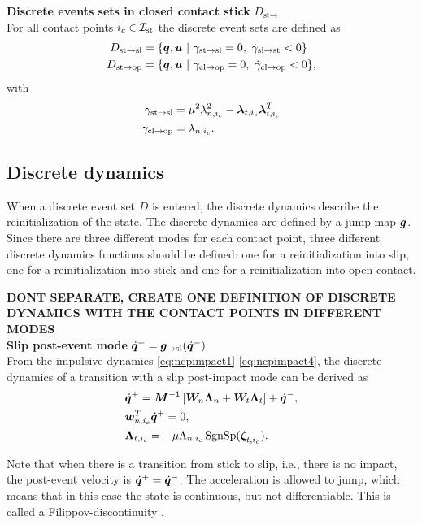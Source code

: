 \documentclass[../DC2017114Bouma.tex]{subfiles}
\begin{document}
\textbf{Discrete events sets in closed contact stick} $D_{\text{st}\rightarrow}$\\
For all contact points $i_c\in\mathcal{I}_{\text{st}}$ the discrete event sets are defined as
\begin{align}
D_{\text{st}\rightarrow\text{sl}} &= \{ \qb,\ub\ |\ \gamma_{\text{st}\rightarrow\text{sl}} = 0,\ \dot{\gamma}_{\text{sl}\rightarrow\text{st}} < 0\}\\
D_{\text{st}\rightarrow\text{op}} &= \{ \qb,\ub\ |\ \gamma_{\text{cl}\rightarrow\text{op}} = 0,\ \dot{\gamma}_{\text{cl}\rightarrow\text{op}} < 0\},
\end{align}
with 
\begin{align}
\gamma_{\text{st}\rightarrow\text{sl}} &= \mu^2\lambda_{n,i_c}^2-\boldsymbol{\lambda}_{t,i_c}\boldsymbol{\lambda}_{t,i_c}^T\\
\gamma_{\text{cl}\rightarrow\text{op}} &= \lambda_{n,i_c}.
\end{align}

\subsection{Discrete dynamics}\label{sec:2discdyn}
When a discrete event set $D$ is entered, the discrete dynamics describe the reinitialization of the state. The discrete dynamics are defined by a jump map ${\boldsymbol{g}}$. Since there are three different modes for each contact point, three different discrete dynamics functions should be defined: one for a reinitialization into slip, one for a reinitialization into stick and one for a reinitialization into open-contact.

\textbf{DONT SEPARATE, CREATE ONE DEFINITION OF DISCRETE DYNAMICS WITH THE CONTACT POINTS IN DIFFERENT MODES}\\
\textbf{Slip post-event mode} $\dot{{\boldsymbol{q}}}^+ = {\boldsymbol{g}}_{\rightarrow\text{sl}}(\dot{{\boldsymbol{q}}}^-)$\\
From the impulsive dynamics \eqref{eq:ncpimpact1}-\eqref{eq:ncpimpact4}, the discrete dynamics of a transition with a slip post-impact mode can be derived as
\begin{align}
&\dot{{\boldsymbol{q}}}^+ = {\boldsymbol{M}}^{-1}\left[{\boldsymbol{W}}_{n}\boldsymbol{\Lambda}_{n} + {\boldsymbol{W}}_{t}\boldsymbol{\Lambda}_{t}\right] + \dot{{\boldsymbol{q}}}^-,\label{eq:discslip1}\\
&{\boldsymbol{w}}^T_{n,i_c}\dot{{\boldsymbol{q}}}^+ = 0,\label{eq:discslip2}\\
&\boldsymbol{\Lambda}_{t,i_c} = -\mu\Lambda_{n,i_c}\operatorname{\text{SgnSp}}(\boldsymbol{\zeta}^-_{t,i_c}).\label{eq:discslip3}
\end{align}


Note that when there is a transition from stick to slip, i.e., there is no impact, the post-event velocity is $\dot{{\boldsymbol{q}}}^+ = \dot{{\boldsymbol{q}}}^-$. The acceleration is allowed to jump, which means that in this case the state is continuous, but not differentiable. This is called a Filippov-discontinuity \cite{Filippov1988}.
\end{document}
